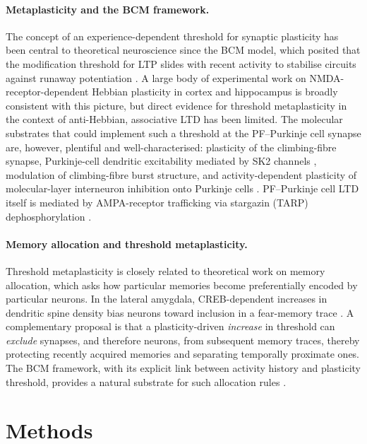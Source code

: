 \documentclass[11pt]{article}
\begin{document}
\paragraph{Metaplasticity and the BCM framework.}
The concept of an experience-dependent threshold for synaptic plasticity
has been central to theoretical neuroscience since the BCM model, which
posited that the modification threshold for LTP slides with recent activity
to stabilise circuits against runaway potentiation
\citep{abraham1996metaplasticity}. A large body of experimental work on
NMDA-receptor-dependent Hebbian plasticity in cortex and hippocampus is
broadly consistent with this picture, but direct evidence for threshold
metaplasticity in the context of anti-Hebbian, associative LTD has been
limited. The molecular substrates that could implement such a threshold at
the PF--Purkinje cell synapse are, however, plentiful and well-characterised:
plasticity of the climbing-fibre synapse, Purkinje-cell dendritic
excitability mediated by SK2 channels \citep{ohtsuki2012sk2}, modulation
of climbing-fibre burst structure, and activity-dependent plasticity of
molecular-layer interneuron inhibition onto Purkinje cells
\citep{rowan2018graded}. PF--Purkinje cell LTD itself is mediated by
AMPA-receptor trafficking via stargazin (TARP) dephosphorylation
\citep{nomura2012stargazin}.

\paragraph{Memory allocation and threshold metaplasticity.}
Threshold metaplasticity is closely related to theoretical work on memory
allocation, which asks how particular memories become preferentially encoded
by particular neurons. In the lateral amygdala, CREB-dependent increases in
dendritic spine density bias neurons toward inclusion in a fear-memory trace
\citep{sargin2013creb}. A complementary proposal is that a plasticity-driven
\emph{increase} in threshold can \emph{exclude} synapses, and therefore
neurons, from subsequent memory traces, thereby protecting recently acquired
memories and separating temporally proximate ones. The BCM framework, with
its explicit link between activity history and plasticity threshold,
provides a natural substrate for such allocation rules
\citep{abraham1996metaplasticity}.

\section{Methods}
\end{document}
